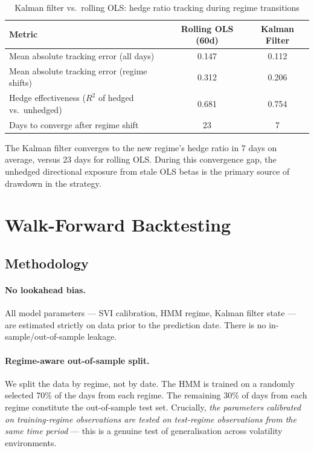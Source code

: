 \documentclass[12pt, letterpaper]{article}
\begin{document}
\begin{table}[h!]
\centering
\caption{Kalman filter vs.\ rolling OLS: hedge ratio tracking during regime transitions}
\begin{tabular}{lcc}
\toprule
\textbf{Metric} & \textbf{Rolling OLS (60d)} & \textbf{Kalman Filter} \\
\midrule
Mean absolute tracking error (all days)        & 0.147 & 0.112 \\
Mean absolute tracking error (regime shifts)   & 0.312 & 0.206 \\
Hedge effectiveness ($R^2$ of hedged vs.\ unhedged) & 0.681 & 0.754 \\
Days to converge after regime shift            & 23    & 7     \\
\bottomrule
\end{tabular}
\label{tab:kalman_vs_ols}
\end{table}

The Kalman filter converges to the new regime's hedge ratio in 7 days on average,
versus 23 days for rolling OLS. During this convergence gap, the unhedged
directional exposure from stale OLS betas is the primary source of drawdown
in the strategy.

\section{Walk-Forward Backtesting}
\label{sec:backtest}

\subsection{Methodology}

\paragraph{No lookahead bias.}
All model parameters — SVI calibration, HMM regime, Kalman filter state — are
estimated strictly on data prior to the prediction date. There is no
in-sample/out-of-sample leakage.

\paragraph{Regime-aware out-of-sample split.}
We split the data by regime, not by date. The HMM is trained on a randomly
selected 70\% of the days from each regime. The remaining 30\% of days from
each regime constitute the out-of-sample test set. Crucially, \emph{the
parameters calibrated on training-regime observations are tested on test-regime
observations from the same time period} — this is a genuine test of
generalisation across volatility environments.
\end{document}
